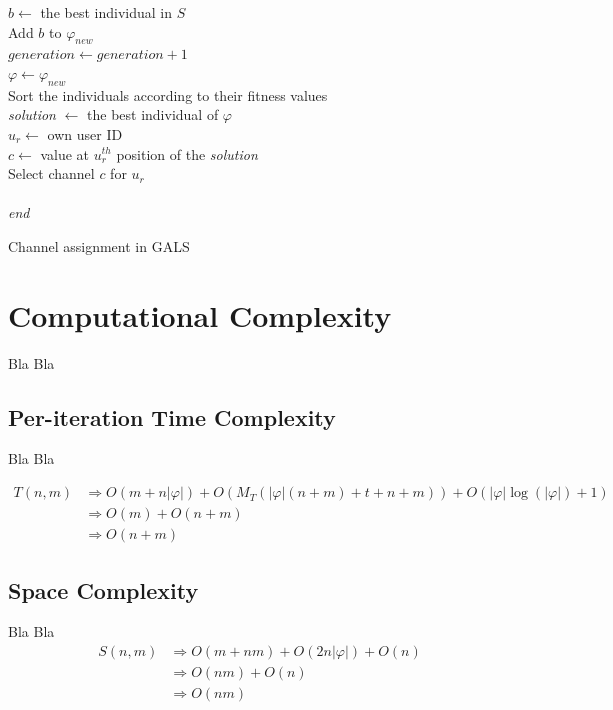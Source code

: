 \begin{center}
\begin{algorithm}[!thb]
{{		$b \leftarrow$  the best individual in $S$ \\
		Add $b$ to $\varphi_{new}$\\		 
	}
	$generation \leftarrow generation + 1$\\
	$\varphi \leftarrow \varphi_{new}$ \\
}
\BlankLine
Sort the individuals according to their fitness values \\
\textit{solution} $\leftarrow$ the best individual of $\varphi$ \\
$u_r \leftarrow$ own user ID \\
$c \leftarrow$ value at $u_r^{th}$ position of the \textit{solution}\\
Select channel $c$ for $u_r$ \\
\Return \\
\BlankLine
\textit{end{}}
\vspace{2mm}
\caption{Channel assignment in GALS}
\label{alg:algo}
\end{algorithm}
\vspace{3mm}
\end{center}



\section{Computational Complexity}
Bla Bla

\subsection{Per-iteration Time Complexity}
Bla Bla

\begin{equation*}
\begin{split}
T(n, m) &\Rightarrow O(m+n |\varphi|) + O(M_T(|\varphi|(n+m)+t+n+m)) + O( |\varphi|\log(|\varphi|) + 1) \\
&\Rightarrow  O(m) + O(n+m) \\
& \Rightarrow O(n+m)
\end{split}
\end{equation*}



\vspace{3mm}
\subsection{Space Complexity}
Bla Bla
\begin{equation*}
\begin{split}
S(n, m) & \Rightarrow O(m+nm) + O(2n |\varphi|) + O(n) \\ 
& \Rightarrow O(nm) + O(n) \\ 
& \Rightarrow O(nm)
\end{split}
\end{equation*}
\vspace{2mm}

